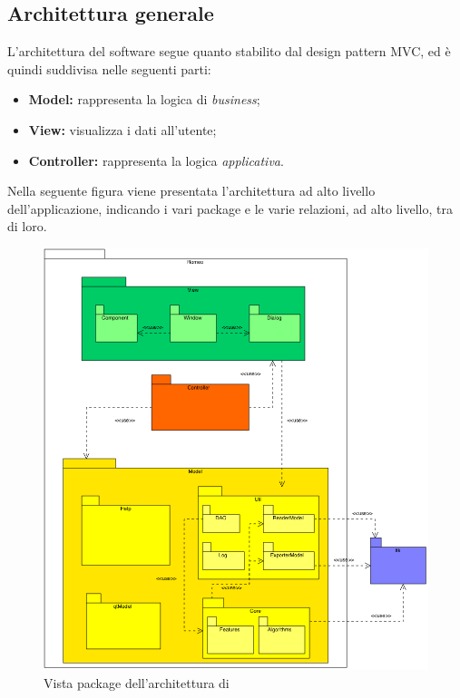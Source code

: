 \subsection{Architettura generale}
\label{arch_generica}
	L'architettura del software segue quanto stabilito dal design pattern\glossario{} MVC\glossario{}, ed è quindi suddivisa nelle seguenti parti:
	\begin{itemize}
		\item \textbf{Model:} rappresenta la logica di \emph{business};
		\item \textbf{View:} visualizza i dati all'utente;
		\item \textbf{Controller:} rappresenta la logica \emph{applicativa}.
	\end{itemize}
	Nella seguente figura viene presentata l'architettura ad alto livello dell'applicazione, indicando i vari package\glossario{} e le varie relazioni, ad alto livello, tra di loro.
	\begin{figure}[!h]
		\centering
		\includegraphics[scale=0.7]{./Content/Immagini/Arch.png}
		\caption{Vista package dell'architettura di \project{}}
		\label{arch_generale}
	\end{figure}
	
	
		
